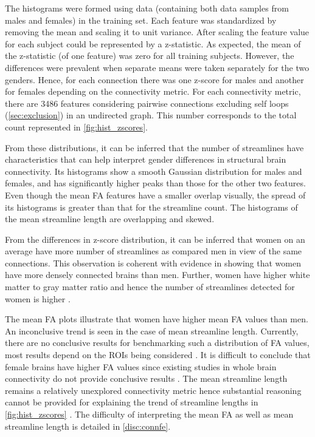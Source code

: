 \documentclass[msthesis.tex]{subfiles}
\begin{document}
The histograms were formed using data (containing both data samples from males and females) in the training set. Each feature was standardized by removing the mean and scaling it to unit variance. After scaling the feature value for each subject could be represented by a z-statistic. As expected, the mean of the z-statistic (of one feature) was zero for all training subjects. However, the differences were prevalent when separate means were taken separately for the two genders. Hence, for each connection there was one z-score for males and another for females depending on the connectivity metric. For each connectivity metric, there are 3486 features considering pairwise connections excluding self loops (\autoref{sec:exclusion}) in an undirected graph. This number corresponds to the total count represented in \cref{fig:hist_zscores}.

From these distributions, it can be inferred that the number of streamlines have characteristics that can help interpret gender differences in structural brain connectivity. Its histograms show a smooth Gaussian distribution for males and females, and has significantly higher peaks than those for the other two features. Even though the mean FA features have a smaller overlap visually, the spread of its histograms is greater than that for the streamline count. The histograms of the mean streamline length are overlapping and skewed.

From the differences in z-score distribution, it can be inferred that women on an average have more number of streamlines as compared men in view of the same connections. This observation is coherent with evidence in \cite{szalkai2015graph} showing that women have more densely connected brains than men. Further, women have higher white matter to gray matter ratio and hence the number of streamlines detected for women is higher \citep{taki2011correlations}.

The mean \gls{FA} plots illustrate that women have higher mean FA values than men. An inconclusive trend is seen in the case of mean streamline length. Currently, there are no conclusive results for benchmarking such a distribution of \gls{FA} values, most results depend on the ROIs being considered \citep{kanaan2012gender}. It is difficult to conclude that female brains have higher FA values since existing studies in whole brain connectivity do not provide conclusive results \citep{ingalhalikar2014sex}. The mean streamline length remains a relatively unexplored connectivity metric hence substantial reasoning cannot be provided for explaining the trend of streamline lengths in \ref{fig:hist_zscores} \citep{BAJADA2019164}.  The difficulty of interpreting the mean \gls{FA} as well as mean streamline length is detailed in \autoref{disc:connfe}.
\end{document}
